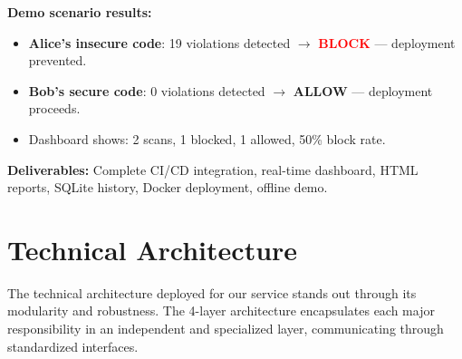 



\noindent\textbf{Demo scenario results:}
\begin{itemize}
    \item \textbf{Alice's insecure code}: 19 violations detected $\rightarrow$ \textcolor{red}{\textbf{BLOCK}} — deployment prevented.
    \item \textbf{Bob's secure code}: 0 violations detected $\rightarrow$ \textcolor{green!50!black}{\textbf{ALLOW}} — deployment proceeds.
    \item Dashboard shows: 2 scans, 1 blocked, 1 allowed, 50\% block rate.
\end{itemize}

\noindent\textbf{Deliverables:} Complete CI/CD integration, real-time dashboard, HTML reports, SQLite history, Docker deployment, offline demo.

\section*{Technical Architecture}

The technical architecture deployed for our service stands out through its modularity and robustness. The 4-layer architecture encapsulates each major responsibility in an independent and specialized layer, communicating through standardized interfaces.

